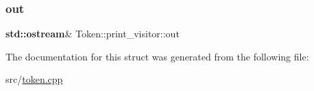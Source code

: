 \subsubsection{\texorpdfstring{out}{out}}
{\footnotesize\ttfamily \textbf{ std\+::ostream}\& Token\+::print\+\_\+visitor\+::out}



The documentation for this struct was generated from the following file\+:\begin{DoxyCompactItemize}
\item 
src/\hyperlink{token_8cpp}{token.\+cpp}\end{DoxyCompactItemize}
